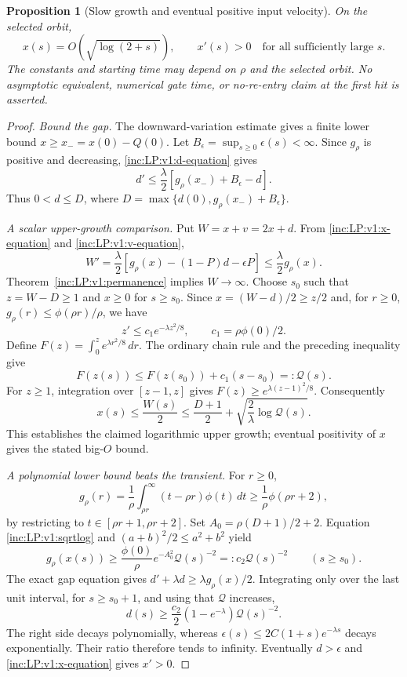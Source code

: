 \documentclass[11pt]{article}
\numberwithin{equation}{section}
\newtheorem{proposition}[theorem]{Proposition}
\theoremstyle{remark}\newtheorem{remark}[theorem]{Remark}
\newcommand{\dd}{\,d}
\begin{document}
\begin{proposition}[Slow growth and eventual positive input velocity]
\label{inc:LP:v1:monotonic-theorem}
On the selected orbit,
\[
 x(s)=O(\sqrt{\log(2+s)}),\qquad x'(s)>0
 \quad\text{for all sufficiently large }s.
\]
The constants and starting time may depend on $\rho$ and the selected
orbit. No asymptotic equivalent, numerical gate time, or no-re-entry claim
at the first hit is asserted.
\end{proposition}
\begin{proof}
\emph{Bound the gap.}
The downward-variation estimate gives a finite lower bound
$x\ge x_-=x(0)-Q(0)$. Let
$B_\epsilon=\sup_{s\ge0}\epsilon(s)<\infty$. Since $g_\rho$ is positive
and decreasing, \eqref{inc:LP:v1:d-equation} gives
\[
 d'\le\frac\lambda2[g_\rho(x_-)+B_\epsilon-d].
\]
Thus $0<d\le D$, where
$D=\max\{d(0),g_\rho(x_-)+B_\epsilon\}$.

\emph{A scalar upper-growth comparison.}
Put $W=x+v=2x+d$. From
\eqref{inc:LP:v1:x-equation} and \eqref{inc:LP:v1:v-equation},
\begin{equation}\label{inc:LP:v1:sum}
 W'=\frac\lambda2[g_\rho(x)-(1-P)d-\epsilon P]
 \le\frac\lambda2g_\rho(x).
\end{equation}
Theorem~\ref{inc:LP:v1:permanence} implies $W\to\infty$. Choose $s_0$
such that $z=W-D\ge1$ and $x\ge0$ for $s\ge s_0$.
Since $x=(W-d)/2\ge z/2$ and, for $r\ge0$,
$g_\rho(r)\le\phi(\rho r)/\rho$, we have
\[
 z'\le c_1e^{-\lambda z^2/8},\qquad
 c_1=\rho\phi(0)/2.
\]
Define $F(z)=\int_0^z e^{\lambda r^2/8}\dd r$. The ordinary chain rule
and the preceding inequality give
\[
 F(z(s))\le F(z(s_0))+c_1(s-s_0)=:\mathcal Q(s).
\]
For $z\ge1$, integration over $[z-1,z]$ gives
$F(z)\ge e^{\lambda(z-1)^2/8}$. Consequently
\begin{equation}\label{inc:LP:v1:sqrtlog}
 x(s)\le\frac{W(s)}2
 \le\frac{D+1}{2}+\sqrt{\frac2\lambda\log\mathcal Q(s)}.
\end{equation}
This establishes the claimed logarithmic upper growth; eventual positivity
of $x$ gives the stated big-$O$ bound.

\emph{A polynomial lower bound beats the transient.}
For $r\ge0$,
\[
 g_\rho(r)=\frac1\rho\int_{\rho r}^\infty(t-\rho r)\phi(t)\dd t
 \ge\frac1\rho\phi(\rho r+2),
\]
by restricting to $t\in[\rho r+1,\rho r+2]$.
Set $A_0=\rho(D+1)/2+2$. Equation \eqref{inc:LP:v1:sqrtlog} and
$(a+b)^2/2\le a^2+b^2$ yield
\begin{equation}\label{inc:LP:v1:gaplower}
 g_\rho(x(s))\ge\frac{\phi(0)}\rho e^{-A_0^2}\mathcal Q(s)^{-2}
 =:c_2\mathcal Q(s)^{-2}\qquad(s\ge s_0).
\end{equation}
The exact gap equation gives
$d'+\lambda d\ge\lambda g_\rho(x)/2$. Integrating only over the last
unit interval, for $s\ge s_0+1$, and using that $\mathcal Q$ increases,
\[
 d(s)\ge\frac{c_2}{2}(1-e^{-\lambda})\mathcal Q(s)^{-2}.
\]
The right side decays polynomially, whereas
$\epsilon(s)\le2C(1+s)e^{-\lambda s}$ decays exponentially. Their ratio
therefore tends to infinity. Eventually $d>\epsilon$ and
\eqref{inc:LP:v1:x-equation} gives $x'>0$.
\end{proof}
\end{document}
